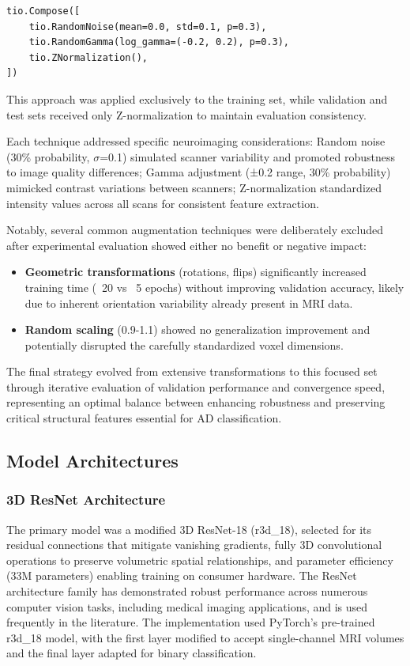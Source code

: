 \documentclass[12pt, a4paper]{article}
\begin{document}
\begin{verbatim}
tio.Compose([
    tio.RandomNoise(mean=0.0, std=0.1, p=0.3),
    tio.RandomGamma(log_gamma=(-0.2, 0.2), p=0.3),
    tio.ZNormalization(),
])
\end{verbatim}

This approach was applied exclusively to the training set, while validation and test sets received only Z-normalization to maintain evaluation consistency.


Each technique addressed specific neuroimaging considerations: Random noise (30\% probability, $\sigma$=0.1) simulated scanner variability and promoted robustness to image quality differences; Gamma adjustment (±0.2 range, 30\% probability) mimicked contrast variations between scanners; Z-normalization standardized intensity values across all scans for consistent feature extraction.

Notably, several common augmentation techniques were deliberately excluded after experimental evaluation showed either no benefit or negative impact:

\begin{itemize}
    \item \textbf{Geometric transformations} (rotations, flips) significantly increased training time (~20 vs ~5 epochs) without improving validation accuracy, likely due to inherent orientation variability already present in MRI data.
    
    \item \textbf{Random scaling} (0.9-1.1) showed no generalization improvement and potentially disrupted the carefully standardized voxel dimensions.
\end{itemize}

The final strategy evolved from extensive transformations to this focused set through iterative evaluation of validation performance and convergence speed, representing an optimal balance between enhancing robustness and preserving critical structural features essential for AD classification.
\subsection{Model Architectures}
\subsubsection{3D ResNet Architecture}

The primary model was a modified 3D ResNet-18 (r3d\_18), selected for its residual connections that mitigate vanishing gradients, fully 3D convolutional operations to preserve volumetric spatial relationships, and parameter efficiency (33M parameters) enabling training on consumer hardware. The ResNet architecture family has demonstrated robust performance across numerous computer vision tasks, including medical imaging applications, and is used frequently in the literature. The implementation used PyTorch's pre-trained r3d\_18 model, with the first layer modified to accept single-channel MRI volumes and the final layer adapted for binary classification.
\end{document}

